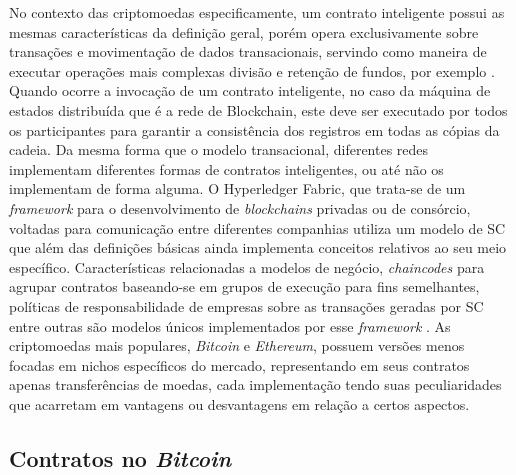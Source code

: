 %
No contexto das criptomoedas especificamente, um contrato inteligente possui as mesmas características da definição geral, porém opera exclusivamente sobre transações e movimentação de dados transacionais, servindo como maneira de executar operações mais complexas divisão e retenção de fundos, por exemplo \cite{blockchain:mastering_bitcoin}. Quando ocorre a invocação de um contrato inteligente, no caso da máquina de estados distribuída que é a rede de Blockchain, este deve ser executado por todos os participantes para garantir a consistência dos registros em todas as cópias da cadeia. Da mesma forma que o modelo transacional, diferentes redes implementam diferentes formas de contratos inteligentes, ou até não os implementam de forma alguma. O Hyperledger Fabric, que trata-se de um \textit{framework} para o desenvolvimento de \textit{blockchains} privadas ou de consórcio, voltadas para comunicação entre diferentes companhias utiliza um modelo de \ac{SC} que além das definições básicas ainda implementa conceitos relativos ao seu meio específico. Características relacionadas a modelos de negócio, \textit{chaincodes} para agrupar contratos baseando-se em grupos de execução para fins semelhantes, políticas de responsabilidade de empresas sobre as transações geradas por \ac{SC} entre outras são modelos únicos implementados por esse \textit{framework} \cite{smart_contracts:hyperledger_fabric}. As criptomoedas mais populares, \textit{Bitcoin} e \textit{Ethereum}, possuem versões menos focadas em nichos específicos do mercado, representando em seus contratos apenas transferências de moedas, cada implementação tendo suas peculiaridades que acarretam em vantagens ou desvantagens em relação a certos aspectos.

\subsection{Contratos no \textit{Bitcoin}}

